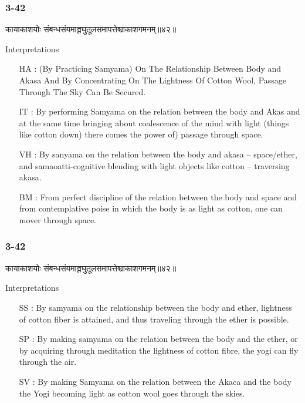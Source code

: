 \begin{frame}[fragile]\frametitle{3-42}
\begin{sanskrit}
कायाकाशयोः संबन्धसंयमाल्लघुतूलसमापत्तेश्चाकाशगमनम्॥४२॥
\end{sanskrit}

Interpretations
\begin{itemize}	
\item [HA]: (By Practicing Samyama) On The Relationship Between Body and Akasa And By Concentrating On The Lightness Of Cotton Wool, Passage Through The Sky Can Be Secured.
\item [IT]: By performing Samyama on the relation between the body and Akas and at the same time bringing about coalescence of the mind with light (things like cotton down) there comes the power of) passage through space.		
\item [VH]: By sanyama on the relation between the body and akasa – space/ether, and samaoatti-cognitive blending with light objects like cotton – traversing akasa.
\item [BM]: From perfect discipline of the relation between the body and space and from contemplative poise in which the body is as light as cotton, one can mover through space.
\end{itemize}
\end{frame}

\begin{frame}[fragile]\frametitle{3-42}
\begin{sanskrit}
कायाकाशयोः संबन्धसंयमाल्लघुतूलसमापत्तेश्चाकाशगमनम्॥४२॥
\end{sanskrit}

Interpretations
\begin{itemize}	
\item [SS]: By samyama on the relationship between the body and ether, lightness of cotton fiber is attained, and thus traveling through the ether is possible.
\item [SP]: By making samyama on the relation between the body and the ether, or by acquiring through meditation the lightness of cotton fibre, the yogi can fly through the air.
\item [SV]: By making Samyama on the relation between the Akaca and the body the Yogi becoming light as cotton wool goes through the skies.
\end{itemize}
\end{frame}


